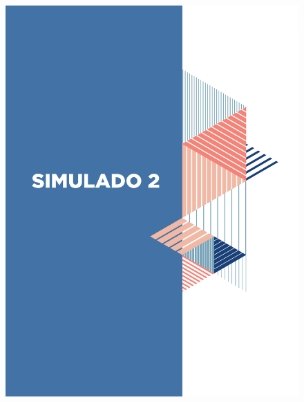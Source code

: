 






\mbox{}

\begin{figure}
\vspace*{-3cm}
\hspace*{-3.7cm}\includegraphics[scale=1]{../watermarks/2simulado9ano.pdf}
\end{figure}


